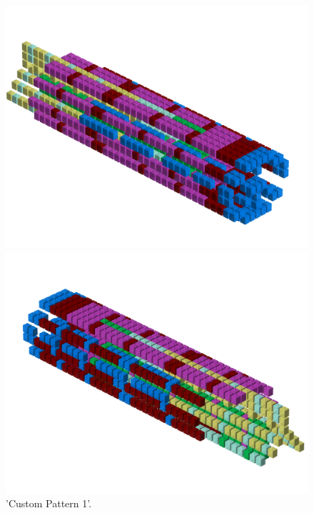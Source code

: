 \begin{figure}[H]
    \centering
    \begin{adjustbox}{width=12cm,center}
      \includegraphics[width=12cm]{src/patterns/pattern8-45.png}%
    \end{adjustbox}
    \begin{adjustbox}{width=12cm,margin=0cm -4cm}
      \includegraphics[width=12cm]{src/patterns/pattern8-225.png}%
    \end{adjustbox}
\caption{'Custom Pattern 1'.}
\end{figure}
\clearpage

